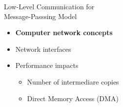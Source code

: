 		\begin{frame}[fragile]{Low-Level Communication for\\Message-Passsing Model}
			\begin{itemize}
				\item \textbf{Computer network concepts}
			\end{itemize}

			\begin{itemize}
				\item Network interfaces
			\end{itemize}

			\begin{itemize}
				\item Performance impacts
				\begin{itemize}
					\item Number of intermediare copies
					\item Direct Memory Access (DMA)
				\end{itemize}
			\end{itemize}

		\end{frame}

